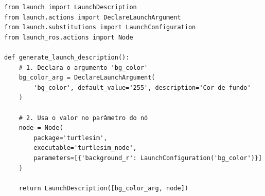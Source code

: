 \documentclass[preview,border=2pt]{standalone}
\begin{document}
\begin{lstlisting}[style=pythonstyle]
from launch import LaunchDescription
from launch.actions import DeclareLaunchArgument
from launch.substitutions import LaunchConfiguration
from launch_ros.actions import Node

def generate_launch_description():
    # 1. Declara o argumento 'bg_color'
    bg_color_arg = DeclareLaunchArgument(
        'bg_color', default_value='255', description='Cor de fundo'
    )

    # 2. Usa o valor no parâmetro do nó
    node = Node(
        package='turtlesim',
        executable='turtlesim_node',
        parameters=[{'background_r': LaunchConfiguration('bg_color')}]
    )

    return LaunchDescription([bg_color_arg, node])
\end{lstlisting}
\end{document}

